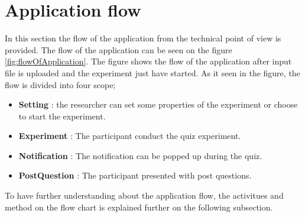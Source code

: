 %

\section{Application flow}
In this section the flow of the application from the technical point of view is provided.
The flow of the application can be seen
on the figure \ref{fig:flowOfApplication}. The figure shows the flow of the application after input file is uploaded and
the experiment just have started.
As it seen in the figure, the flow is divided into four scope;
\begin{itemize}
\item \textbf{Setting}  : the researcher can set some properties of the experiment or choose to start the experiment.
\item \textbf{Experiment} : The participant conduct the quiz experiment.
\item \textbf{Notification} : The notification can be popped up during the quiz.
\item \textbf{PostQuestion} : The participant presented with post questions.
\end{itemize}
\par

To have further understanding about the application flow, the activitues and method on the flow chart is explained further on the following subsection.



